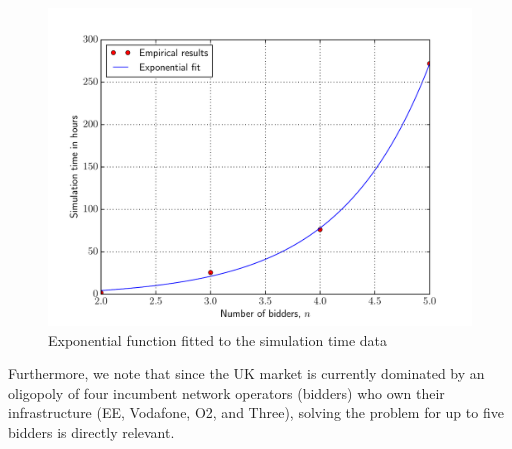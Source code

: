 \begin{figure}[t!]
  \includegraphics[width=\figsize]{Approximation/Figures/simulation_time}
  \caption{Exponential function fitted to the simulation time data}
  \label{fig:simulation_time_approximation}
\end{figure}

Furthermore, we note that since the UK market is currently dominated by an oligopoly of four incumbent network operators (bidders) who own their infrastructure (EE, Vodafone, O2, and Three), solving the problem for up to five bidders is directly relevant.

